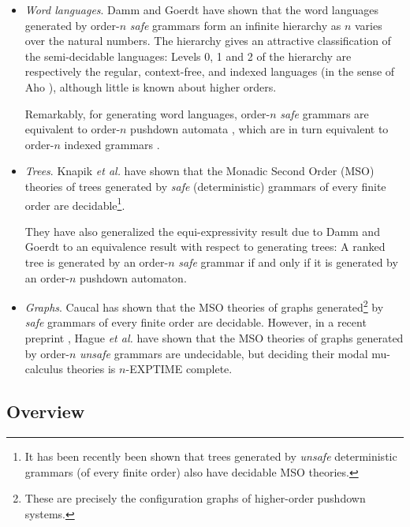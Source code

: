 \documentclass{llncs}
\begin{document}
\begin{itemize}
\item \emph{Word languages}. Damm and Goerdt \cite{DG86} have shown
  that the word languages generated by order-$n$ \emph{safe} grammars
  form an infinite hierarchy as $n$ varies over the natural numbers.
  The hierarchy gives an attractive classification of the
  semi-decidable languages: Levels 0, 1 and 2 of the hierarchy are
  respectively the regular, context-free, and indexed languages (in
  the sense of Aho \cite{Aho68}), although little is known about
  higher orders.

  Remarkably, for generating word languages, order-$n$ \emph{safe}
  grammars are equivalent to order-$n$ pushdown automata \cite{DG86},
  which are in turn equivalent to order-$n$ indexed grammars
  \cite{Mas74,Mas76}.

\item \emph{Trees}. Knapik \emph{et al.} have shown that the Monadic
  Second Order (MSO) theories of trees generated by \emph{safe}
  (deterministic) grammars of every finite order are
  decidable\footnote{It has been recently been shown
    \cite{OngLics2006} that trees generated by \emph{unsafe}
    deterministic grammars (of every finite order) also have decidable
    MSO theories.}.

  They have also generalized the equi-expressivity result due to Damm
  and Goerdt \cite{DG86} to an equivalence result with respect to
  generating trees: A ranked tree is generated by an order-$n$ \emph{safe}
  grammar if and only if it is generated by an order-$n$ pushdown
  automaton.

\item \emph{Graphs}. Caucal \cite{Cau02} has shown that the MSO
  theories of graphs generated\footnote{These are precisely the
    configuration graphs of higher-order pushdown systems.} by
  \emph{safe} grammars of every finite order are decidable. However,
  in a recent preprint \cite{hague-sto07}, Hague \emph{et al.} have
  shown that the MSO theories of graphs generated by order-$n$
  \emph{unsafe} grammars are undecidable, but deciding their modal
  mu-calculus theories is $n$-EXPTIME complete.
\end{itemize}

\subsection*{Overview}
\end{document}
